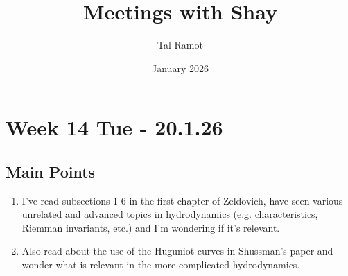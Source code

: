 \documentclass[11pt]{article}
\title{Meetings with Shay}
\author{Tal Ramot}
\date{January 2026}
\begin{document}
\maketitle
\section{Week 14 Tue - 20.1.26}
\subsection{Main Points}
\begin{enumerate}
    \item I've read subsections 1-6 in the first chapter of Zeldovich, have seen various unrelated and advanced topics in hydrodynamics (e.g. characteristics, Riemman invariants, etc.) and I'm wondering if it's relevant.
    \item Also read about the use of the Huguniot curves in Shussman's paper and wonder what is relevant in the more complicated hydrodynamics.
\end{enumerate}
\end{document}
